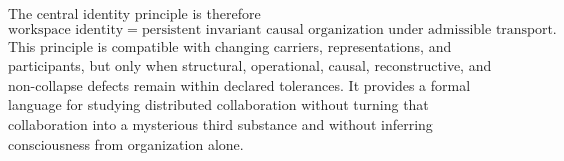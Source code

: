The central identity principle is therefore
\[
\boxed{
\text{workspace identity}
=
\text{persistent invariant causal organization under admissible transport}.
}
\]
This principle is compatible with changing carriers, representations, and participants, but only when
structural, operational, causal, reconstructive, and non-collapse defects remain within declared tolerances.
It provides a formal language for studying distributed collaboration without turning that collaboration
into a mysterious third substance and without inferring consciousness from organization alone.

